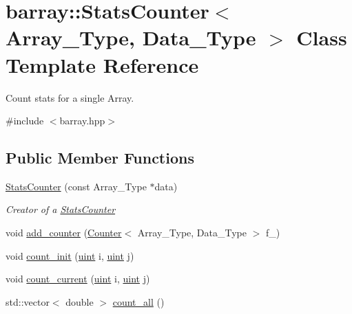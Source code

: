 \hypertarget{classbarray_1_1_stats_counter}{}\section{barray\+:\+:Stats\+Counter$<$ Array\+\_\+\+Type, Data\+\_\+\+Type $>$ Class Template Reference}
\label{classbarray_1_1_stats_counter}


Count stats for a single Array.  




{\ttfamily \#include $<$barray.\+hpp$>$}

\subsection*{Public Member Functions}
\begin{DoxyCompactItemize}
\item 
\hyperlink{classbarray_1_1_stats_counter_a3cbb563fbe257755837649db27a35136}{Stats\+Counter} (const Array\+\_\+\+Type $\ast$data)
\begin{DoxyCompactList}\small\item\em Creator of a {\ttfamily \hyperlink{classbarray_1_1_stats_counter}{Stats\+Counter}} \end{DoxyCompactList}\item 
void \hyperlink{classbarray_1_1_stats_counter_ad175dcd2bd30d017881783de546ac333}{add\+\_\+counter} (\hyperlink{classbarray_1_1_counter}{Counter}$<$ Array\+\_\+\+Type, Data\+\_\+\+Type $>$ f\+\_\+)
\item 
void \hyperlink{classbarray_1_1_stats_counter_a19bd5936619e190c0d8918b4f343922e}{count\+\_\+init} (\hyperlink{namespacebarray_af9756a31953db233f80a9cfe1ef31c32}{uint} i, \hyperlink{namespacebarray_af9756a31953db233f80a9cfe1ef31c32}{uint} j)
\item 
void \hyperlink{classbarray_1_1_stats_counter_ab81166f7cb67eeaecc469016d237019a}{count\+\_\+current} (\hyperlink{namespacebarray_af9756a31953db233f80a9cfe1ef31c32}{uint} i, \hyperlink{namespacebarray_af9756a31953db233f80a9cfe1ef31c32}{uint} j)
\item 
std\+::vector$<$ double $>$ \hyperlink{classbarray_1_1_stats_counter_a83bd92031a1499109c98f238221cbd67}{count\+\_\+all} ()
\end{DoxyCompactItemize}
